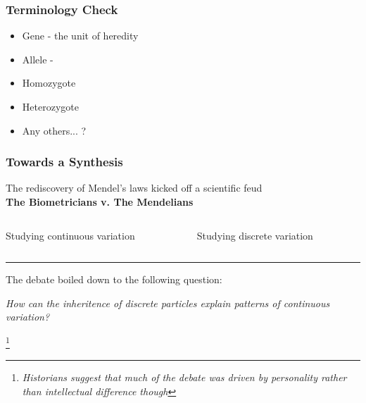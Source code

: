 \documentclass{beamer}
\newcommand\blfootnote[1]{%
	\begingroup
	\renewcommand\thefootnote{}\footnote{#1}%
	\addtocounter{footnote}{-1}%
	\endgroup
}
\begin{document}
\begin{frame}

\frametitle{Terminology Check}

\begin{itemize}
	\item Gene - the unit of heredity
	\item Allele - 
	\item Homozygote
	\item Heterozygote
	\item Any others... ?
	
\end{itemize}

\end{frame}


\begin{frame}
	
	\frametitle{Towards a Synthesis}
\begin{center}
The rediscovery of Mendel's laws kicked off a scientific feud \\\textbf{The Biometricians v. The Mendelians}
\end{center}
\begin{columns}
\begin{column}{0.5\textwidth}
	\begin{flushright}
	Studying continuous variation
	\end{flushright}
	\end{column}
	\begin{column}{0.5\textwidth}
	\begin{flushleft}
		Studying discrete variation
	\end{flushleft}
\end{column}

\end{columns}

\vspace{3pt}

\hrule \pause
\vspace{5pt}

The debate boiled down to the following question:
\vspace{5pt}

\begin{center}
	\textit{How can the inheritence of discrete particles explain patterns of continuous variation?}
\end{center}
\blfootnote{ \textit{Historians suggest that much of the debate was driven by personality rather than intellectual difference though} }
 


\end{frame}
\end{document}

